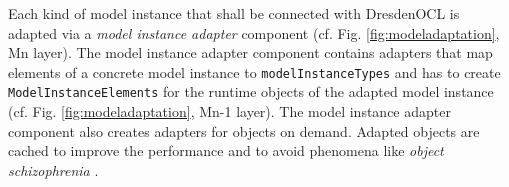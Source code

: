 	Each kind of model instance that shall be connected with DresdenOCL is
	adapted via a \emph{model instance adapter} component (cf. Fig.
	\ref{fig:modeladaptation}, Mn layer). The model instance adapter component contains adapters that map elements of a
	concrete model instance to \texttt{modelInstanceTypes} and has to
	create \texttt{Model\-Instance\-Elements} for the runtime 
	objects of the adapted model instance (cf. Fig. \ref{fig:modeladaptation}, Mn-1 layer). 
	The model instance adapter component also 
	creates adapters for objects on demand. Adapted objects are cached to
	improve the performance and to avoid phenomena like \emph{object
	schizophrenia} \cite{assmann:isc}.
	


